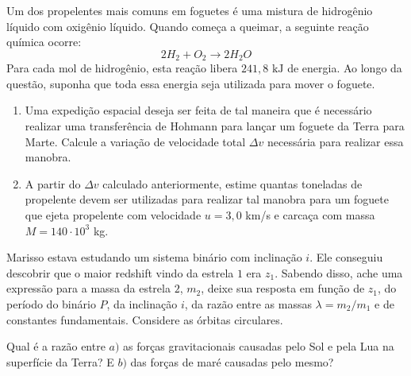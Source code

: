 \documentclass[11pt]{article}
\begin{document}
\begin{pproblem} Um dos propelentes mais comuns em foguetes é uma mistura de hidrogênio líquido com oxigênio líquido. Quando começa a queimar, a seguinte reação química ocorre:
    \[
    2H_2 + O_2 \rightarrow 2H_2O
    \] 
    Para cada mol de hidrogênio, esta reação libera \(241,8 \text{ kJ}\) de energia. Ao longo da questão, suponha que toda essa energia seja utilizada para mover o foguete.
    \begin{enumerate}[label=\textbf{\alph*)}]
        \item Uma expedição espacial deseja ser feita de tal maneira que é necessário realizar uma transferência de Hohmann para lançar um foguete da Terra para Marte. Calcule a variação de velocidade total \(\Delta v\) necessária para realizar essa manobra.
        \item A partir do \(\Delta v\) calculado anteriormente, estime quantas toneladas de propelente devem ser utilizadas para realizar tal manobra para um foguete que ejeta propelente com velocidade \(u = 3,0\) km/s e carcaça com massa \(M = 140\cdot10^3\) kg.
    \end{enumerate}
    
\end{pproblem}

\begin{pproblem} Marisso estava estudando um sistema binário com inclinação \(i\). Ele conseguiu descobrir que o maior redshift vindo da estrela \(1\) era \(z_1\). Sabendo disso, ache uma expressão para a massa da estrela \(2\), \(m_2\), deixe sua resposta em função de \(z_1\), do período do binário \(P\), da inclinação \(i\), da razão entre as massas \(\lambda  = m_2/m_1\) e de constantes fundamentais. Considere as órbitas circulares.
    
\end{pproblem}

\begin{pproblem} Qual é a razão entre \(a)\) as forças gravitacionais causadas pelo Sol e pela Lua na superfície da Terra? E \(b)\) das forças de maré causadas pelo mesmo?
    
\end{pproblem}
\end{document}
